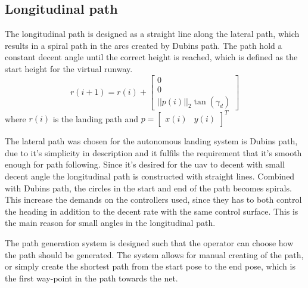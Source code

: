 \subsection{Longitudinal path}
The longitudinal path is designed as a straight line along the lateral path, which results in a spiral path in the arcs created by Dubins path. The path hold a constant decent angle until the correct height is reached, which is defined as the start height for the virtual runway.
\begin{equation}
r(i+1) = r(i) +
\begin{bmatrix}
0\\
0\\
||p(i)||_2\tan(\gamma_d)
\end{bmatrix}
\end{equation}
where $r(i)$ is the landing path and 
$p = \begin{bmatrix}
x(i) & y(i)
\end{bmatrix}^T
$

The lateral path was chosen for the autonomous landing system is Dubins path, due to it's simplicity in description and it fulfils the requirement that it's smooth enough for path following. Since it's desired for the \gls{uav} to decent with small decent angle the longitudinal path is constructed with straight lines. Combined with Dubins path, the circles in the start and end of the path becomes spirals. This increase the demands on the controllers used, since they has to both control the heading in addition to the decent rate with the same control surface. This is the main reason for small angles in the longitudinal path.

The path generation system is designed such that the operator can choose how the path should be generated. The system allows for manual creating of the path, or simply create the shortest path from the start pose to the end pose, which is the first way-point in the path towards the net.